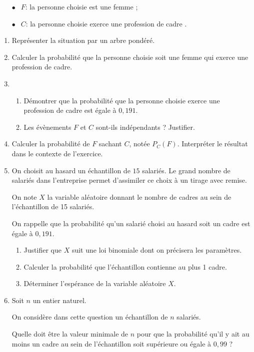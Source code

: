 \documentclass[11pt,a4paper,french]{article}
\begin{document}
\setlength\parindent{1cm}
\begin{itemize}
\item[$\bullet~~$] $F$: \og la personne choisie est une femme \fg{} ;
\item[$\bullet~~$] $C$: \og la personne choisie exerce une profession de cadre \fg.
\end{itemize}
\setlength\parindent{0cm}

\medskip

\begin{enumerate}
\item Représenter la situation par un arbre pondéré.
\item Calculer la probabilité que la personne choisie soit une femme qui exerce une profession de cadre.
\item 
	\begin{enumerate}
		\item Démontrer que la probabilité que la personne choisie exerce une profession de cadre est égale à $0,191$.
		\item Les évènements $F$ et $C$ sont-ils indépendants ? Justifier.
	\end{enumerate}	
\item Calculer la probabilité de $F$ sachant $C$, notée $P_C(F)$. Interpréter le résultat dans le
contexte de l'exercice.
\item On choisit au hasard un échantillon de $15$ salariés. Le grand nombre de salariés
dans l'entreprise permet d'assimiler ce choix à un tirage avec remise. 

On note $X$ la variable aléatoire donnant le nombre de cadres au sein de
l'échantillon de 15 salariés.

On rappelle que la probabilité qu'un salarié choisi au hasard soit un cadre est
égale à $0,191$.
	\begin{enumerate}
		\item Justifier que $X$ suit une loi binomiale dont on précisera les paramètres. 
		\item Calculer la probabilité que l'échantillon contienne au plus 1 cadre.
		\item Déterminer l'espérance de la variable aléatoire $X$.
	\end{enumerate}	
\item Soit $n$ un entier naturel.

On considère dans cette question un échantillon de $n$ salariés.

Quelle doit être la valeur minimale de $n$ pour que la probabilité qu'il y ait au moins un cadre au sein de l'échantillon soit supérieure ou égale à $0,99$ ?
\end{enumerate}
\end{document}
